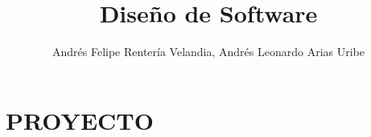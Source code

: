 \documentclass[11pt,letterpaper]{book}
\title{Diseño de Software}
\author{Andrés Felipe Rentería Velandia, Andrés Leonardo Arias Uribe}
\begin{document}
\maketitle
\tableofcontents
\listoffigures

\part{PROYECTO}

\end{document}
